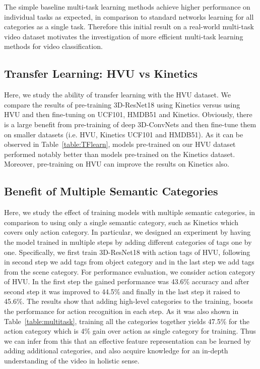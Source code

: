 \documentclass[runningheads]{llncs}
\begin{document}
The simple baseline multi-task learning methods achieve higher performance on individual tasks as expected, in comparison to standard networks learning for all categories as a single task. Therefore this initial result on a real-world multi-task video dataset motivates the investigation of more efficient multi-task learning methods 
for video classification. 





\subsection{Transfer Learning: HVU vs Kinetics}
Here, we study the ability of transfer learning with the HVU dataset. We compare the results of pre-training  3D-ResNet18 using Kinetics versus using HVU and then fine-tuning on UCF101, HMDB51 and Kinetics. Obviously, there is a large benefit from pre-training of deep 3D-ConvNets and then fine-tune them on smaller datasets (i.e. HVU, Kinetics  UCF101 and HMDB51). As it can be observed in Table~\ref{table:TFlearn}, models pre-trained on our HVU dataset performed notably better than models pre-trained on the Kinetics dataset. Moreover, pre-training on HVU can improve the results on Kinetics also.

\subsection{Benefit of Multiple Semantic Categories}
Here, we study the effect of training models with multiple semantic categories, in comparison to using only a single semantic category, such as Kinetics which covers only action category. In particular, we designed an experiment by having the model trained in multiple steps by adding different categories of tags one by one. Specifically, we first train 3D-ResNet18 with action tags of HVU, following in second step we add tags from object category and in the last step we add tags from the scene category. For performance evaluation, we consider action category of HVU. In the first step the gained performance was 43.6\% accuracy and after second step it was improved to 44.5\% and finally in the last step it raised to 45.6\%. The results show that adding high-level categories to the training, boosts the performance for action recognition in each step. As it was also shown in Table~\ref{table:multitask}, training all the categories together yields 47.5\% for the action category which is 4\% gain over action as single category for training. Thus we can infer from this that an effective feature representation can be learned by adding additional categories, and also acquire knowledge for an in-depth understanding of the video in holistic sense. \vspace{-0.2cm}
\end{document}
